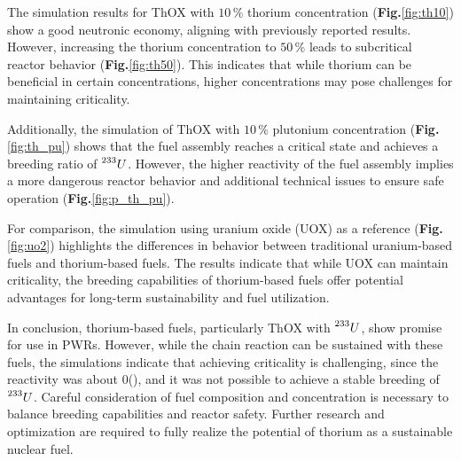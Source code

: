 The simulation results for ThOX with \(10 \, \%\) thorium concentration (\textbf{Fig.}\ref{fig:th10}) show a good neutronic economy, aligning with previously reported results. However, increasing the thorium concentration to \(50 \, \%\) leads to subcritical reactor behavior (\textbf{Fig.}\ref{fig:th50}). This indicates that while thorium can be beneficial in certain concentrations, higher concentrations may pose challenges for maintaining criticality.

Additionally, the simulation of ThOX with \(10 \, \%\) plutonium concentration (\textbf{Fig.}\ref{fig:th_pu}) shows that the fuel assembly reaches a critical state and achieves a breeding ratio of \(\prescript{233}{}{U}\). However, the higher reactivity of the fuel assembly implies a more dangerous reactor behavior and additional technical issues to ensure safe operation (\textbf{Fig.}\ref{fig:p_th_pu}).

For comparison, the simulation using uranium oxide (UOX) as a reference (\textbf{Fig.}\ref{fig:uo2}) highlights the differences in behavior between traditional uranium-based fuels and thorium-based fuels. The results indicate that while UOX can maintain criticality, the breeding capabilities of thorium-based fuels offer potential advantages for long-term sustainability and fuel utilization.

In conclusion, thorium-based fuels, particularly ThOX with \(\prescript{233}{}{U}\), show promise for use in PWRs. However, while the chain reaction can be sustained with these fuels, the simulations indicate that achieving criticality is challenging, since the reactivity was about \(0\)(), and it was not possible to achieve a stable breeding of \(\prescript{233}{}{U}\). Careful consideration of fuel composition and concentration is necessary to balance breeding capabilities and reactor safety. Further research and optimization are required to fully realize the potential of thorium as a sustainable nuclear fuel.

